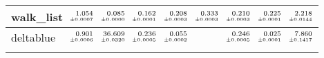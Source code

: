 \documentclass[a4paper,UKenglish]{lipics-v2016}
\begin{document}
\begin{table*}
\begin{adjustbox}{width=1.2\textwidth,center}
\begin{tabular}{lrrrrrrrr}
\addlinespace
walk\_list&$\substack{\mathmakebox[.7cm][r]{1.054}\\{\mathmakebox[.7cm][r]{\scriptscriptstyle \pm 0.0007}}}$&$\substack{\mathmakebox[.7cm][r]{0.085}\\{\mathmakebox[.7cm][r]{\scriptscriptstyle \pm 0.0000}}}$&$\substack{\mathmakebox[.7cm][r]{0.162}\\{\mathmakebox[.7cm][r]{\scriptscriptstyle \pm 0.0001}}}$&$\substack{\mathmakebox[.7cm][r]{0.208}\\{\mathmakebox[.7cm][r]{\scriptscriptstyle \pm 0.0003}}}$&$\substack{\mathmakebox[.7cm][r]{0.333}\\{\mathmakebox[.7cm][r]{\scriptscriptstyle \pm 0.0003}}}$&$\substack{\mathmakebox[.7cm][r]{0.210}\\{\mathmakebox[.7cm][r]{\scriptscriptstyle \pm 0.0003}}}$&$\substack{\mathmakebox[.7cm][r]{0.225}\\{\mathmakebox[.7cm][r]{\scriptscriptstyle \pm 0.0001}}}$&$\substack{\mathmakebox[.7cm][r]{2.218}\\{\mathmakebox[.7cm][r]{\scriptscriptstyle \pm 0.0144}}}$\\
\midrule
deltablue&$\substack{\mathmakebox[.7cm][r]{0.901}\\{\mathmakebox[.7cm][r]{\scriptscriptstyle \pm 0.0006}}}$&$\substack{\mathmakebox[.7cm][r]{36.609}\\{\mathmakebox[.7cm][r]{\scriptscriptstyle \pm 0.0320}}}$&$\substack{\mathmakebox[.7cm][r]{0.236}\\{\mathmakebox[.7cm][r]{\scriptscriptstyle \pm 0.0005}}}$&$\substack{\mathmakebox[.7cm][r]{0.055}\\{\mathmakebox[.7cm][r]{\scriptscriptstyle \pm 0.0002}}}$&&$\substack{\mathmakebox[.7cm][r]{0.246}\\{\mathmakebox[.7cm][r]{\scriptscriptstyle \pm 0.0005}}}$&$\substack{\mathmakebox[.7cm][r]{0.025}\\{\mathmakebox[.7cm][r]{\scriptscriptstyle \pm 0.0001}}}$&$\substack{\mathmakebox[.7cm][r]{7.860}\\{\mathmakebox[.7cm][r]{\scriptscriptstyle \pm 0.1417}}}$\\
\addlinespace

\end{tabular}
\end{adjustbox}
\end{table*}
\end{document}
